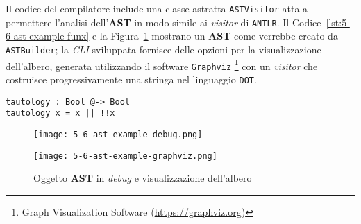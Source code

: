 \newpage

\noindent Il codice del compilatore include una classe astratta \texttt{ASTVisitor} atta a permettere l'analisi
dell'\textbf{AST} in modo simile ai \textit{visitor} di \texttt{ANTLR}.
Il Codice~\ref{lst:5-6-ast-example-funx} e la Figura~\ref{fig:5-6-ast-example-debug-graphviz}
mostrano un \textbf{AST} come verrebbe creato da \texttt{ASTBuilder}; la \textit{CLI} sviluppata fornisce
delle opzioni per la visualizzazione dell'albero, generata utilizzando il software \texttt{Graphviz}%
\footnote{Graph Visualization Software (\url{https://graphviz.org})}
con un \textit{visitor} che costruisce progressivamente una stringa nel linguaggio \texttt{DOT}.

\vspace{4mm}
\begin{lstlisting}[caption={Programma in \textbf{Funx}}, style=funxCode, label={lst:5-6-ast-example-funx}]
tautology : Bool @-> Bool
tautology x = x || !!x
\end{lstlisting}

\begin{figure}
    \vspace{4mm}
    \begin{minipage}[c]{0.6\textwidth}
        \centering
        \texttt{[image: 5-6-ast-example-debug.png]}
    \end{minipage}%
    \hfill
    \begin{minipage}[c]{0.4\textwidth}
        \centering
        \texttt{[image: 5-6-ast-example-graphviz.png]}
    \end{minipage}
    \caption{Oggetto \textbf{AST} in \textit{debug} e visualizzazione dell'albero}
    \label{fig:5-6-ast-example-debug-graphviz}
\end{figure}